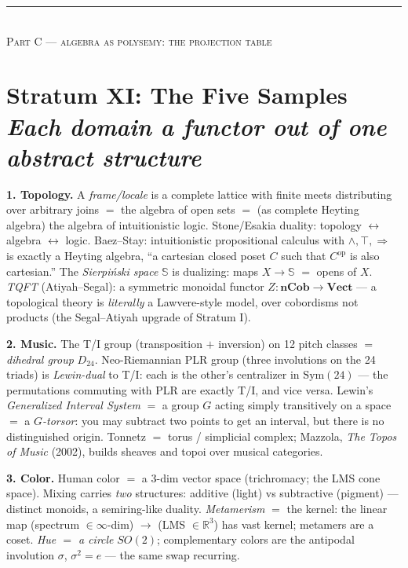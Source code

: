 \documentclass[11pt]{article}
\theoremstyle{plain}
\theoremstyle{definition}
\theoremstyle{remark}
\newcommand{\Vect}{\mathbf{Vect}}
\newcommand{\Cob}{\mathbf{nCob}}
\newcommand{\op}{\mathrm{op}}
\newcommand{\stratum}[2]{\section{#1\\ {\normalsize\normalfont\itshape #2}}}
\begin{document}
\begin{center}\color{silmaril}\rule{0.25\textwidth}{0.4pt}\\[0.3em]\textsc{Part C --- algebra as polysemy: the projection table}\end{center}

\stratum{Stratum XI: The Five Samples}{Each domain a functor out of one abstract structure}

\textbf{1. Topology.} A \emph{frame/locale} is a complete lattice with finite meets distributing over arbitrary joins $=$ the algebra of open sets $=$ (as complete Heyting algebra) the algebra of intuitionistic logic. Stone/Esakia duality: topology $\leftrightarrow$ algebra $\leftrightarrow$ logic. Baez--Stay: intuitionistic propositional calculus with $\wedge,\top,\Rightarrow$ is exactly a Heyting algebra, ``a cartesian closed poset $C$ such that $C^{\op}$ is also cartesian.'' The \emph{Sierpi\'nski space} $\mathbb{S}$ is dualizing: maps $X\to\mathbb{S}$ $=$ opens of $X$. \emph{TQFT} (Atiyah--Segal): a symmetric monoidal functor $Z\colon \Cob \to \Vect$ --- a topological theory is \emph{literally} a Lawvere-style model, over cobordisms not products (the Segal--Atiyah upgrade of Stratum I).

\textbf{2. Music.} The T/I group (transposition $+$ inversion) on 12 pitch classes $=$ \emph{dihedral group} $D_{24}$. Neo-Riemannian PLR group (three involutions on the 24 triads) is \emph{Lewin-dual} to T/I: each is the other's centralizer in $\mathrm{Sym}(24)$ --- the permutations commuting with PLR are exactly T/I, and vice versa. Lewin's \emph{Generalized Interval System} $=$ a group $G$ acting simply transitively on a space $=$ a \emph{$G$-torsor}: you may subtract two points to get an interval, but there is no distinguished origin. Tonnetz $=$ torus / simplicial complex; Mazzola, \emph{The Topos of Music} (2002), builds sheaves and topoi over musical categories.

\textbf{3. Color.} Human color $=$ a 3-dim vector space (trichromacy; the LMS cone space). Mixing carries \emph{two} structures: additive (light) vs subtractive (pigment) --- distinct monoids, a semiring-like duality. \emph{Metamerism} $=$ the kernel: the linear map (spectrum $\in \infty$-dim) $\to$ (LMS $\in \mathbb{R}^3$) has vast kernel; metamers are a coset. \emph{Hue $=$ a circle} $SO(2)$; complementary colors are the antipodal involution $\sigma$, $\sigma^2=e$ --- the same swap recurring.
\end{document}
